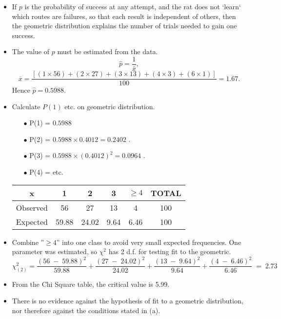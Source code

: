 \documentclass[a4paper,12pt]{article}
\begin{document}
	
	\large
	\begin{itemize}
		\item If $p$ is the probability of success at any attempt, and the rat does not `learn` which routes are
		failures, so that each result is independent of others, then the geometric distribution explains the
		number of trials needed to gain one success.
		\item The value of $p$ must be estimated from the data.
		\[ \hat{p} = \frac{1}{\bar{x}} ,\] 
		\[\bar{x} = \frac{[(1 \times 56) + (2 \times 27) + (3 \times 13) + (4 \times 3) + (6 \times 1)]}{100} = 1.67.\]
		Hence $\hat{p} = 0.5988$.\\ 
		\item Calculate $P(1)$ etc. on geometric distribution.
		\begin{itemize}
			\item[$\bullet$] P(1) \;=\; $0.5988$ 
			\item[$\bullet$] P(2) \;=\; $0.5988\times0.4012=0.2402$ .
			\item[$\bullet$] P(3) \;=\; $0.5988 \times (0.4012)^2=0.0964$ . 
			\item[$\bullet$] P(4) \;=\; 0.0387 etc.
		\end{itemize}
		
		\begin{center}
			\begin{tabular}{|c|c|c|c|c|c|} \hline
				x & 1 & 2 & 3 & $\geq 4$ & TOTAL \\ \hline 
				Observed & 56 & 27 & 13 & 4 & 100 \\ \hline
				Expected & 59.88 & 24.02 & 9.64 & 6.46 & 100\\ \hline
			\end{tabular}
		\end{center}
		\large
		\item Combine ”$ \geq 4$” into one class to avoid very small expected frequencies. One parameter was
		estimated, so $\chi^{2}$ has 2 d.f. for testing fit to the geometric.
		\[\chi^{2}_{(2)} =
		\frac{(56\;-\; 59.88)^2}{
			59.88}
		+
		\frac{(27  \;-\; 24.02)^2}{24.02}
		+
		\frac{(13 \;-\;  9.64)^2}{9.64}
		+
		\frac{(4 \;-\;  6.46)^2}{6.46}
		\;=\; 2.73\]
		\item From the Chi Square table, the critical value is 5.99.
		\item There is no evidence against the hypothesis of fit to a geometric distribution, nor therefore against
		the conditions stated in (a).
	\end{itemize}
\end{document}
